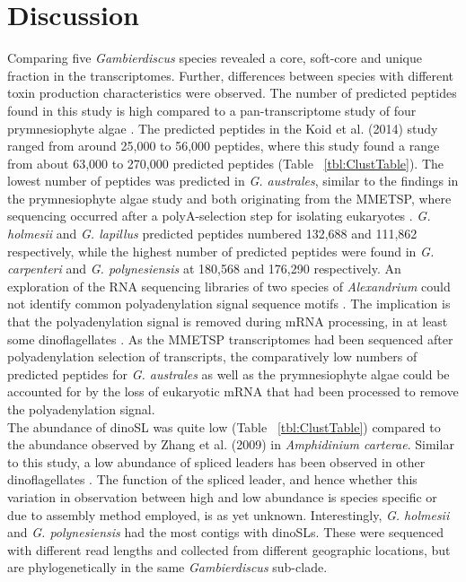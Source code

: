 \documentclass[12pt]{article}
\begin{document}
\section{Discussion}
Comparing five \textit{Gambierdiscus} species revealed a core, soft-core and unique fraction in the transcriptomes. 
Further, differences between species with different toxin production characteristics were observed. 
The number of predicted peptides found in this study is high compared to a pan-transcriptome study of four prymnesiophyte algae \cite{koid2014comparative}. 
The predicted peptides in the Koid et al. (2014) study ranged from around 25,000 to 56,000 peptides, where this study found a range from about 63,000 to 270,000 predicted peptides (Table ~\ref{tbl:ClustTable}). 
The lowest number of peptides was predicted in \textit{G. australes}, similar to the findings in the prymnesiophyte algae study and both originating from the MMETSP, where sequencing occurred after a polyA-selection step for isolating eukaryotes \cite{keeling2014marine,koid2014comparative}. 
\textit{G. holmesii} and \textit{G. lapillus} predicted peptides numbered 132,688 and 111,862 respectively, while the highest number of predicted peptides were found in \textit{G. carpenteri} and \textit{G. polynesiensis} at 180,568 and 176,290 respectively. %
An exploration of the RNA sequencing libraries of two species of \textit{Alexandrium} could not identify common polyadenylation signal sequence motifs \cite{jaeckisch2011comparative}. 
The implication is that the polyadenylation signal is removed during mRNA processing, in at least some dinoflagellates \cite{bachvaroff2008stop,jaeckisch2011comparative}. 
As the MMETSP transcriptomes had been sequenced after polyadenylation selection of transcripts, the comparatively low numbers of predicted peptides for \textit{G. australes} as well as the prymnesiophyte algae could be accounted for by the loss of eukaryotic mRNA that had been processed to remove the polyadenylation signal.\\
The abundance of dinoSL was quite low (Table ~\ref{tbl:ClustTable}) compared to the abundance observed by Zhang et al. (2009) in \textit{Amphidinium carterae}. 
Similar to this study, a low abundance of spliced leaders has been observed in other dinoflagellates \cite{guo2011spliced,bachvaroff2008stop}. 
The function of the spliced leader, and hence whether this variation in observation between high and low abundance is species specific or due to assembly method employed, is as yet unknown.
Interestingly, \textit{G. holmesii} and \textit{G. polynesiensis} had the most contigs with dinoSLs. 
These were sequenced with different read lengths and collected from different geographic locations, but are phylogenetically in the same \textit{Gambierdiscus} sub-clade. %
\end{document}
